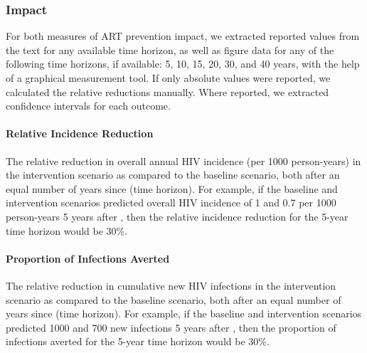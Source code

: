 \subsubsection{Impact}
\label{aa:defs:impact}
For both measures of ART prevention impact,
we extracted reported values from the text for any available time horizon,
as well as figure data for any of the following time horizons, if available:
5, 10, 15, 20, 30, and 40 years, with the help of a graphical measurement tool.
If only absolute values were reported, we calculated the relative reductions manually.
Where reported, we extracted confidence intervals for each outcome.
\paragraph{Relative Incidence Reduction}
The relative reduction in overall annual HIV incidence (per 1000 person-years)
in the intervention scenario as compared to the baseline scenario,
both after an equal number of years since  (time horizon).
For example, if the baseline and intervention scenarios predicted
overall HIV incidence of 1 and 0.7 per 1000 person-years 5 years after ,
then the relative incidence reduction for the 5-year time horizon would be 30\%.
\paragraph{Proportion of Infections Averted}
The relative reduction in cumulative new HIV infections
in the intervention scenario as compared to the baseline scenario,
both after an equal number of years since  (time horizon).
For example, if the baseline and intervention scenarios predicted
1000 and 700 new infections 5 years after ,
then the proportion of infections averted for the 5-year time horizon would be 30\%.
